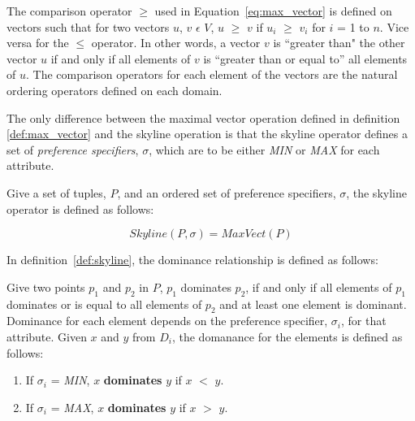 The comparison operator $\geq$ used in
Equation~\ref{eq:max_vector} is defined on vectors such that for
two vectors $u$, $v$ $\epsilon$ $V$, $u$ $\geq$ $v$ if $u_i$
$\geq$ $v_i$ for $i$ = 1 to $n$. Vice versa for the $\leq$
operator. In other words, a vector $v$ is ``greater than" the
other vector $u$ if and only if all elements of $v$ is ``greater
than or equal to'' all elements of $u$. The comparison operators
for each element of the vectors are the natural ordering operators
defined on each domain.

The only difference between the maximal vector operation defined
in definition \ref{def:max_vector} and the skyline operation is
that the skyline operator defines a set of \emph{preference
specifiers}, $\sigma$, which are to be either \emph{MIN} or
\emph{MAX} for each attribute.



\begin{definition}\label{def:skyline}
Give a set of tuples, $P$, and an ordered set of preference
specifiers, $\sigma$, the skyline operator is defined as follows:

\begin{equation}\label{eq:skyline}
    Skyline(P, \sigma) = MaxVect(P)
\end{equation}

\end{definition}

In definition~\ref{def:skyline}, the dominance relationship is
defined as follows:

\begin{definition}\label{def:dom_rel}
Give two points $p_1$ and $p_2$ in $P$, $p_1$ dominates $p_2$, if
and only if all elements of $p_1$ dominates or is equal to all
elements of $p_2$ and at least one element is dominant. Dominance
for each element depends on the preference specifier, $\sigma_i$,
for that attribute. Given $x$ and $y$ from $D_i$, the domanance
for the elements is defined as follows:

\begin{enumerate}
\item If $\sigma_i$ = \emph{MIN}, $x$ {\bf dominates} $y$ if $x$
$<$ $y$. \item If $\sigma_i$ = \emph{MAX}, $x$ {\bf dominates} $y$
if $x$ $>$ $y$.
\end{enumerate}

\end{definition}


